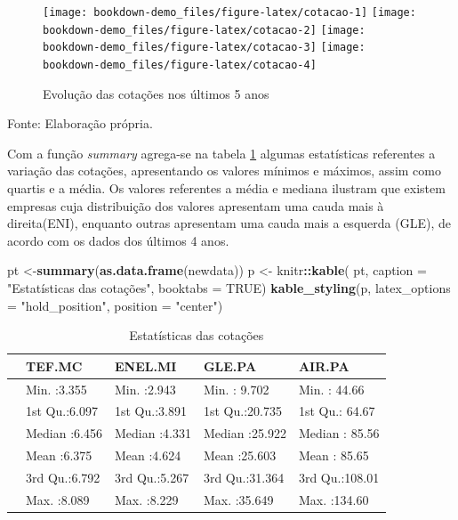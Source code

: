 \documentclass[
  12pt,
  a4paper,
  openany]{book}
\newenvironment{Shaded}{\begin{snugshade}}{\end{snugshade}}
\newcommand{\DataTypeTok}[1]{\textcolor[rgb]{0.13,0.29,0.53}{#1}}
\newcommand{\KeywordTok}[1]{\textcolor[rgb]{0.13,0.29,0.53}{\textbf{#1}}}
\newcommand{\NormalTok}[1]{#1}
\newcommand{\OperatorTok}[1]{\textcolor[rgb]{0.81,0.36,0.00}{\textbf{#1}}}
\newcommand{\OtherTok}[1]{\textcolor[rgb]{0.56,0.35,0.01}{#1}}
\newcommand{\StringTok}[1]{\textcolor[rgb]{0.31,0.60,0.02}{#1}}
\begin{document}
\begin{figure}

{\centering \texttt{[image: bookdown-demo\_files/figure-latex/cotacao-1]} \texttt{[image: bookdown-demo\_files/figure-latex/cotacao-2]} \texttt{[image: bookdown-demo\_files/figure-latex/cotacao-3]} \texttt{[image: bookdown-demo\_files/figure-latex/cotacao-4]} 

}

\caption{Evolução das cotações nos últimos 5 anos}\label{fig:cotacao}
\end{figure}
\FloatBarrier
\centering

Fonte: Elaboração própria.

\justifying
\bigskip

Com a função \emph{summary} agrega-se na tabela \ref{tab:estcot} algumas estatísticas referentes a variação das cotações, apresentando os valores mínimos e máximos, assim como quartis e a média. Os valores referentes a média e mediana ilustram que existem empresas cuja distribuição dos valores apresentam uma cauda mais à direita(ENI), enquanto outras apresentam uma cauda mais a esquerda (GLE), de acordo com os dados dos últimos 4 anos.

\scriptsize

\begin{Shaded}
\begin{Highlighting}[]
\NormalTok{pt \textless{}{-}}\KeywordTok{summary}\NormalTok{(}\KeywordTok{as.data.frame}\NormalTok{(newdata))}
\NormalTok{p \textless{}{-}}\StringTok{ }\NormalTok{knitr}\OperatorTok{::}\KeywordTok{kable}\NormalTok{(}
\NormalTok{  pt, }\DataTypeTok{caption =} \StringTok{"Estatísticas das cotações"}\NormalTok{,}
  \DataTypeTok{booktabs =} \OtherTok{TRUE}\NormalTok{)}
\KeywordTok{kable\_styling}\NormalTok{(p, }\DataTypeTok{latex\_options =} \StringTok{"hold\_position"}\NormalTok{, }\DataTypeTok{position =} \StringTok{"center"}\NormalTok{)}
\end{Highlighting}
\end{Shaded}

\begin{table}[!h]

\caption{\label{tab:estcot}Estatísticas das cotações}
\centering
\begin{tabular}[t]{lllll}
\toprule
  &     TEF.MC &    ENEL.MI &     GLE.PA &     AIR.PA\\
\midrule
 & Min.   :3.355 & Min.   :2.943 & Min.   : 9.702 & Min.   : 44.66\\
 & 1st Qu.:6.097 & 1st Qu.:3.891 & 1st Qu.:20.735 & 1st Qu.: 64.67\\
 & Median :6.456 & Median :4.331 & Median :25.922 & Median : 85.56\\
 & Mean   :6.375 & Mean   :4.624 & Mean   :25.603 & Mean   : 85.65\\
 & 3rd Qu.:6.792 & 3rd Qu.:5.267 & 3rd Qu.:31.364 & 3rd Qu.:108.01\\
\addlinespace
 & Max.   :8.089 & Max.   :8.229 & Max.   :35.649 & Max.   :134.60\\
\bottomrule
\end{tabular}
\end{table}
\normalsize
\FloatBarrier
\centering
\end{document}
